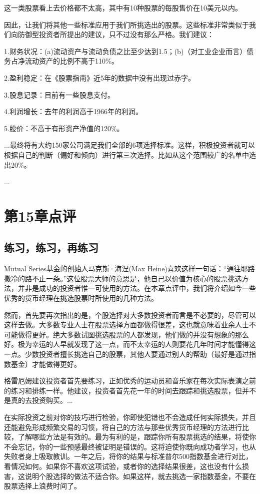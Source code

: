 \documentclass[12pt,oneside]{book}
\begin{document}
这一类股票看上去价格都不太高，其中有10种股票的每股售价在10美元以内。

因此，让我们将其他一些标准应用于我们所挑选出的股票。这些标准非常类似于我们向防御型投资者所提出的建议，只不过没有那么严格。我们建议：

1.财务状况：(a)流动资产与流动负债之比至少达到1.5；(b)（对工业企业而言）债务占净流动资产的比例不高于110\%。

2.盈利稳定：在《股票指南》近5年的数据中没有出现过赤字。

3.股息记录：目前有一些股息支付。

4.利润增长：去年的利润高于1966年的利润。

5.股价：不高于有形资产净值的120\%。

...最终将有大约150家公司满足我们全部的6项选择标准。这样，积极投资者就可以根据自己的判断（偏好和倾向）进行第三次选择。比如从这个范围较广的名单中选出20\%。

...



\section{第15章点评}
\subsection{练习，练习，再练习}
Mutual Series基金的创始人马克斯·海涅(Max Heine)喜欢这样一句话：“通往耶路撒冷的路不止一条。”这位股票大师的意思是，他自己以价值为核心的股票挑选方法，并非是成功的投资者惟一可使用的方法。在本章点评中，我们将介绍如今一些优秀的货币经理在挑选股票时所使用的几种方法。

然而，首先要再次指出的是，个股选择对大多数投资者而言是不必要的，尽管可以这样去做。大多数专业人士在股票选择方面都做得很差，这也就意味着业余人士不可能做得更好。绝大多数试图挑选股票的人都发现，他们做的并没有想象的那么好。极为幸运的人早就发现了这一点，而不太幸运的人则要花几年时间才能懂得这一点。少数投资者擅长挑选自己的股票，其他人要通过别人的帮助（最好是通过指数基金）才能做得更好。

格雷厄姆建议投资者首先要练习，正如优秀的运动员和音乐家在每次实际表演之前的练习和排练一样。他建议，投资者首先花一年的时间去跟踪和挑选股票，但并不是真的去投资购买。...

在实际投资之前对你的技巧进行检验，你即使犯错也不会造成任何实际损失，并且还能避免形成频繁交易的习惯，将自己的方法与那些优秀货币经理的方法进行比较，了解哪些方法是有效的。最为有利的是，跟踪你所有股票挑选的结果，将使你不会忘记，你的一些预感最终被证明是错误的。这将迫使你既向成功者学习，也从失败者身上吸取教训。一年之后，将你的结果与标准普尔500指数基金进行对比，看情况如何。如果你不喜欢这项试验，或者你的选择结果很差，这也没有什么损害，这说明个股选择的做法不适合你。如果这样，就去挑选一家指数基金，不要在股票选择上浪费时间了。
\end{document}
